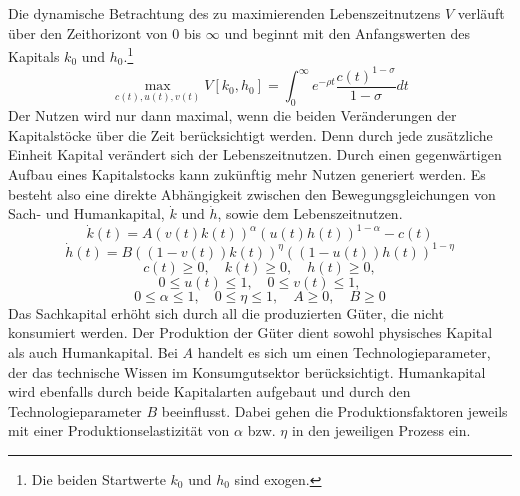 Die dynamische Betrachtung des zu maximierenden Lebenszeitnutzens $V$ verläuft über den Zeithorizont von $0$ bis $\infty$ und beginnt mit den Anfangswerten des Kapitals $k_0$ und $h_0$.\footnote{Die beiden Startwerte $k_0$ und $h_0$ sind exogen.}
\begin{equation}\operatorname*{max}_{c(t),u(t),v(t)}V[k_0,h_0]= \int_{0}^\infty e^{-\rho t} \frac{c(t)^{1-\sigma}}{1-\sigma}dt\end{equation}
Der Nutzen wird nur dann maximal, wenn die beiden Veränderungen der Kapitalstöcke über die Zeit berücksichtigt werden. Denn durch jede zusätzliche Einheit Kapital verändert sich der Lebenszeitnutzen. Durch einen gegenwärtigen Aufbau eines Kapitalstocks kann zukünftig mehr Nutzen generiert werden. Es besteht also eine direkte Abhängigkeit zwischen den Bewegungsgleichungen von Sach- und Humankapital, $\dot{k}$ und $\dot{h}$, sowie dem Lebenszeitnutzen.
		\begin{equation}\dot{k}(t)=A(v(t)k(t))^\alpha(u(t)h(t))^{1-\alpha}-c(t)\end{equation}\vspace{-0.8cm}
		\begin{equation} \dot{h}(t)=B((1-v(t))k(t))^{\eta}((1-u(t))h(t))^{1-\eta}\end{equation}
		\vspace{-0.3cm}
		\begin{displaymath} c(t)\geq 0,\quad k(t)\geq 0,\quad h(t)\geq 0, \end{displaymath}
		\begin{displaymath} 0\leq u(t)\leq 1,\quad 0\leq v(t) \leq1, \end{displaymath}
		\begin{displaymath} 0\leq \alpha\leq 1,\quad 0\leq \eta \leq1, \quad A\geq 0, \quad B\geq 0\end{displaymath}
Das Sachkapital erhöht sich durch all die produzierten Güter, die nicht konsumiert werden. Der Produktion der Güter dient sowohl physisches Kapital als auch Humankapital. Bei $A$ handelt es sich um einen Technologieparameter, der das technische Wissen im Konsumgutsektor berücksichtigt. Humankapital wird ebenfalls durch beide Kapitalarten aufgebaut und durch den Technologieparameter $B$ beeinflusst. Dabei gehen die Produktionsfaktoren jeweils mit einer Produktionselastizität von $\alpha$ bzw. $\eta$ in den jeweiligen Prozess ein.\\
